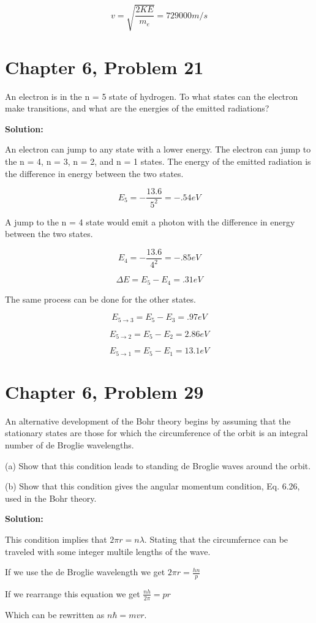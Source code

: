 \documentclass{article}
\begin{document}
$$ v = \sqrt{\frac{2KE}{m_e}} = 729000 m/s $$

\section{Chapter 6, Problem 21}
An electron is in the n = 5 state of hydrogen. To what states can the electron make transitions, and what are the energies of the emitted radiations?

\textbf{Solution:}

An electron can jump to any state with a lower energy. The electron can jump to the n = 4, n = 3, n = 2, and n = 1 states. The energy of the emitted radiation is the difference in energy between the two states.

$$E_{5} = -\frac{13.6}{5^2} = -.54 eV$$

A jump to the n = 4 state would emit a photon with the difference in energy between the two states.

$$E_{4} = -\frac{13.6}{4^2} = -.85 eV$$

$$\Delta E = E_{5} - E_{4} = .31 eV$$

The same process can be done for the other states.

$$ E_{5\rightarrow3} = E_{5} - E_{3} = .97 eV$$

$$ E_{5\rightarrow2} = E_{5} - E_{2} = 2.86 eV$$

$$ E_{5\rightarrow1} = E_{5} - E_{1} = 13.1 eV$$




\section{Chapter 6, Problem 29}
An alternative development of the Bohr theory begins by assuming that the stationary states are those for which the circumference of the orbit is an integral number of de Broglie wavelengths. 

(a) Show that this condition leads to standing de Broglie waves around the orbit. 

(b) Show that this condition gives the angular momentum condition, Eq. 6.26, used in the Bohr theory.

\textbf{Solution:}

This condition implies that $2 \pi r = n \lambda$. Stating that the circumfernce can be traveled with some integer multile lengths of the wave.

If we use the de Broglie wavelength we get $2 \pi r = \frac{hn}{p}$

If we rearrange this equation we get $ \frac{nh}{2 \pi} = pr $

Which can be rewritten as $ n \hbar = mvr $.
\end{document}
